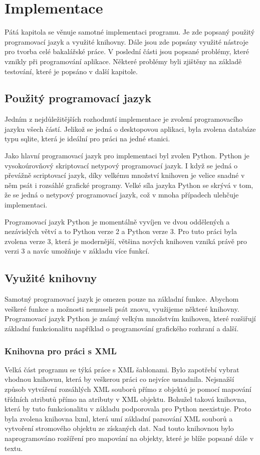\documentclass[thesis=B,czech]{resources/FITthesis}[2012/06/26]
\begin{document}
\chapter{Implementace}
Pátá kapitola se věnuje samotné implementaci programu. Je zde popsaný použitý programovací jazyk a využité knihovny.  Dále jsou zde popsány využité nástroje pro tvorba celé bakalářské práce. V poslední části jsou popsané problémy, které vznikly při programování aplikace. Některé problémy byli zjištěny na základě testování, které je popsáno v další kapitole.
\section{Použitý programovací jazyk}
Jedním z nejdůležitějších rozhodnutí implementace je zvolení programovacího jazyku všech částí. Jelikož se jedná o desktopovou aplikaci, byla zvolena databáze typu sqlite, která je ideální pro práci na jedné stanici. \par
Jako hlavní programovací jazyk pro implementaci byl zvolen Python. Python je vysokoúrovňový skriptovací netypový programovací jazyk. I když se jedná o převážně scriptovací jazyk, díky velkému množství knihoven je velice snadné v něm psát i rozsáhlé grafické programy. Velké síla jazyka Python se skrývá v tom, že se jedná o netypový programovací jazyk, což v mnoha případech ulehčuje implementaci. \par

Programovací jazyk Python je momentálně vyvíjen ve dvou oddělených a nezávislých větví a to Python verze 2 a Python verze 3. Pro tuto práci byla zvolena verze 3, která je modernější, většina nových knihoven vzniká právě pro verzi 3 a navíc umožňuje v základu více funkcí.

\section{Využité knihovny}
Samotný programovací jazyk je omezen pouze na základní funkce. Abychom veškeré funkce a možnosti nemuseli psát znovu, využijeme některé knihovny. Programovací jazyk Python je známý velkým množstvím knihoven, které rozšiřují základní funkcionalitu například o programování grafického rozhraní a další. 
\subsection{Knihovna pro práci s XML}

Velká část programu se týká práce s XML šablonami. Bylo zapotřebí vybrat vhodnou knihovnu, která by veškerou práci co nejvíce usnadnila. Nejsnažší způsob vytváření rozsáhlých XML souborů přímo z objektů je pomocí mapování třídních atributů přímo na atributy v XML objektu. Bohužel taková knihovna, která by tuto funkcionalitu v základu podporovala pro Python neexistuje. Proto byla zvolena knihovna lxml\cite{lxml}, která umí základní parsování XML souborů a vytvoření stromového objektu ze získaných dat. Nad touto knihovnou bylo naprogramováno rozšíření pro mapování na objekty, které je blíže popsané dále v textu.
\end{document}
